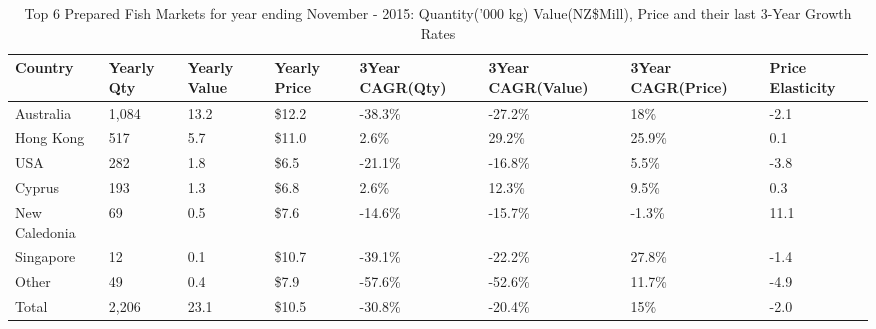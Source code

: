 \begin{table}[ht]
\centering
{\scriptsize
\begin{tabular}[t]{p{1.8cm}>{\hfill}p{1.4cm}>{\hfill}p{1.4cm}>{\hfill}p{1.6cm}>{\hfill}p{1.9cm}>{\hfill}p{2cm}>{\hfill}p{1.9cm}>{\hfill}p{1.5cm}}
 \textbf{Country} & \textbf{Yearly Qty} & \textbf{Yearly Value} & \textbf{Yearly Price} & \textbf{3Year CAGR(Qty)} & \textbf{3Year CAGR(Value)} & \textbf{3Year CAGR(Price)} & \textbf{Price Elasticity} \\
\hline
Australia & 1,084 & 13.2 & \$12.2 & -38.3\% & -27.2\% & 18\% & -2.1 \\  
Hong Kong & 517 & 5.7 & \$11.0 & 2.6\% & 29.2\% & 25.9\% & 0.1 \\  
USA & 282 & 1.8 & \$6.5 & -21.1\% & -16.8\% & 5.5\% & -3.8 \\  
Cyprus & 193 & 1.3 & \$6.8 & 2.6\% & 12.3\% & 9.5\% & 0.3 \\  
New Caledonia & 69 & 0.5 & \$7.6 & -14.6\% & -15.7\% & -1.3\% & 11.1 \\  
Singapore & 12 & 0.1 & \$10.7 & -39.1\% & -22.2\% & 27.8\% & -1.4 \\  
Other & 49 & 0.4 & \$7.9 & -57.6\% & -52.6\% & 11.7\% & -4.9 \\  
Total & 2,206 & 23.1 & \$10.5 & -30.8\% & -20.4\% & 15\% & -2.0 \\  
\hline
\end{tabular}
}
\caption{\scriptsize Top 6 Prepared Fish Markets for year ending November - 2015: Quantity('000 kg) Value(NZ\$Mill), Price and their last 3-Year Growth Rates}
\end{table}

